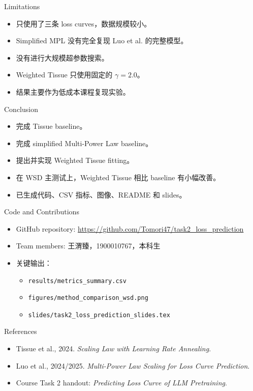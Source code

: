 \documentclass[aspectratio=169,11pt]{beamer}
\begin{document}
\begin{frame}{Limitations}
  \begin{itemize}
    \item 只使用了三条 loss curves，数据规模较小。
    \item Simplified MPL 没有完全复现 Luo et al. 的完整模型。
    \item 没有进行大规模超参数搜索。
    \item Weighted Tissue 只使用固定的 $\gamma=2.0$。
    \item 结果主要作为低成本课程复现实验。
  \end{itemize}
\end{frame}

\begin{frame}{Conclusion}
  \begin{itemize}
    \item 完成 Tissue baseline。
    \item 完成 simplified Multi-Power Law baseline。
    \item 提出并实现 Weighted Tissue fitting。
    \item 在 WSD 主测试上，Weighted Tissue 相比 baseline 有小幅改善。
    \item 已生成代码、CSV 指标、图像、README 和 slides。
  \end{itemize}
\end{frame}

\begin{frame}{Code and Contributions}
  \begin{itemize}
    \item GitHub repository: \url{https://github.com/Tomori47/task2\_loss\_prediction}
    \item Team members: 王渭臻，1900010767，本科生
    \item 关键输出：
      \begin{itemize}
        \item \texttt{results/metrics\_summary.csv}
        \item \texttt{figures/method\_comparison\_wsd.png}
        \item \texttt{slides/task2\_loss\_prediction\_slides.tex}
      \end{itemize}
  \end{itemize}
\end{frame}

\begin{frame}{References}
  \begin{itemize}
    \item Tissue et al., 2024. \textit{Scaling Law with Learning Rate Annealing}.
    \item Luo et al., 2024/2025. \textit{Multi-Power Law Scaling for Loss Curve Prediction}.
    \item Course Task 2 handout: \textit{Predicting Loss Curve of LLM Pretraining}.
  \end{itemize}
\end{frame}
\end{document}
